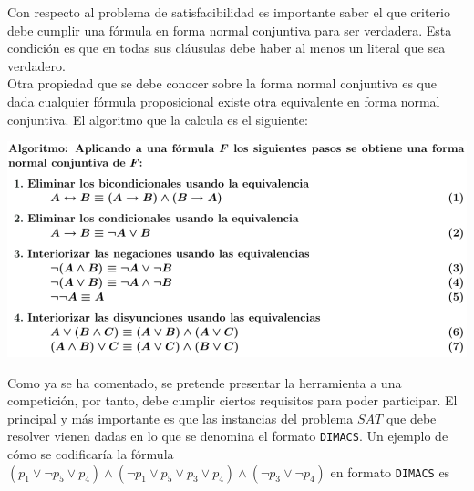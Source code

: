 Con respecto al problema de satisfacibilidad es importante saber el que criterio debe cumplir una fórmula en forma normal conjuntiva para ser verdadera. Esta condición es que en todas sus cláusulas debe haber al menos un literal que sea verdadero.\\

Otra propiedad que se debe conocer sobre la forma normal conjuntiva es que dada cualquier fórmula proposicional existe otra equivalente en forma normal conjuntiva. El algoritmo \cite{apuntes} que la calcula es el siguiente:

\begin{center}
\includegraphics[scale=0.45]{imagenes/algfnc}
\end{center}

Como ya se ha comentado, se pretende presentar la herramienta a una competición, por tanto, debe cumplir ciertos requisitos para poder participar. El principal y más importante es que las instancias del problema $SAT$ que debe resolver vienen dadas en lo que se denomina el formato \texttt{DIMACS}. Un ejemplo de cómo se codificaría la fórmula $(p_1 \vee \neg p_5 \vee p_4)\wedge(\neg p_1 \vee p_5 \vee p_3 \vee p_4) \wedge (\neg p_3 \vee \neg p_4)$ en formato \texttt{DIMACS} es

